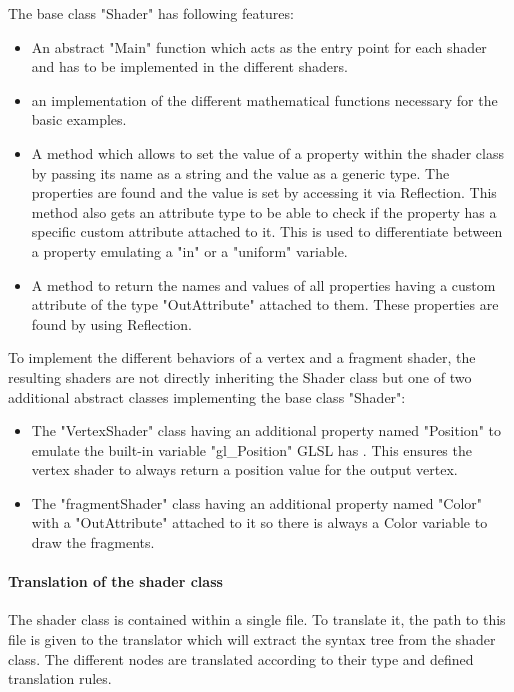 The base class "Shader" has following features:
\begin{itemize}
\item An abstract "Main" function which acts as the entry point for each shader and has to be implemented in the different shaders.
\item an implementation of the different mathematical functions necessary for the basic examples.
\item A method which allows to set the value of a property within the shader class by passing its name as a string and the value as a generic type. The properties are found and the value is set by accessing it via Reflection. This method also gets an attribute type to be able to check if the property has a specific custom attribute attached to it. This is used to differentiate between a property emulating a "in" or a "uniform" variable.
\item A method to return the names and values of all properties having a custom attribute of the type "OutAttribute" attached to them. These properties are found by using Reflection.
\end{itemize}

To implement the different behaviors of a vertex and a fragment shader, the resulting shaders are not directly inheriting the Shader class but one of two additional abstract classes implementing the base class "Shader":
\begin{itemize}
\item The "VertexShader" class having an additional property named "Position" to emulate the built-in variable "gl\_Position" GLSL has . This ensures the vertex shader to always return a position value for the output vertex.
\item The "fragmentShader" class having an additional property named "Color" with a "OutAttribute" attached to it so there is always a Color variable to draw the fragments.
\end{itemize}

\paragraph{Translation of the shader class}

The shader class is contained within a single file. To translate it, the path to this file is given to the translator which will extract the syntax tree from the shader class. The different nodes are translated according to their type and defined translation rules.

